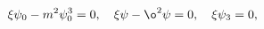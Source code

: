 \begin{equation} \label{thinwall}
  \xi\psi_0-m^2\psi_0^3=0, \quad
  \xi\psi-\o^2\psi=0, \quad
  \xi\psi_3=0,
\end{equation}

